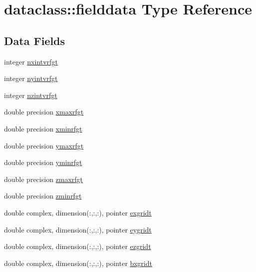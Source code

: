 \hypertarget{structdataclass_1_1fielddata}{}\section{dataclass\+::fielddata Type Reference}
\label{structdataclass_1_1fielddata}
\subsection*{Data Fields}
\begin{DoxyCompactItemize}
\item 
integer \mbox{\hyperlink{structdataclass_1_1fielddata_a9746624865dee3cb084893c584d68b39}{nxintvrfgt}}
\item 
integer \mbox{\hyperlink{structdataclass_1_1fielddata_a57cb8c3f96c761c3253882bf8ea9aca3}{nyintvrfgt}}
\item 
integer \mbox{\hyperlink{structdataclass_1_1fielddata_afce0f79fa31eb44ce2deb1e1ff0efca9}{nzintvrfgt}}
\item 
double precision \mbox{\hyperlink{structdataclass_1_1fielddata_ac91ac792a03611b9d7ea7e9491a9f932}{xmaxrfgt}}
\item 
double precision \mbox{\hyperlink{structdataclass_1_1fielddata_a48a580850e3d44d65f42d8c6a5c7892c}{xminrfgt}}
\item 
double precision \mbox{\hyperlink{structdataclass_1_1fielddata_a41bea18fe0cd9cb24dcab4f811a53d20}{ymaxrfgt}}
\item 
double precision \mbox{\hyperlink{structdataclass_1_1fielddata_a817fb5a469a1095749da14db38aaff2b}{yminrfgt}}
\item 
double precision \mbox{\hyperlink{structdataclass_1_1fielddata_aa1e1937a10ecb4f84e61ab79dfc8b0e3}{zmaxrfgt}}
\item 
double precision \mbox{\hyperlink{structdataclass_1_1fielddata_a7f273248f53c831222242a3cccedd14e}{zminrfgt}}
\item 
double complex, dimension(\+:,\+:,\+:), pointer \mbox{\hyperlink{structdataclass_1_1fielddata_ab07faecce00908ad73041a02d4906c31}{exgridt}}
\item 
double complex, dimension(\+:,\+:,\+:), pointer \mbox{\hyperlink{structdataclass_1_1fielddata_a639f6d59caf105d71786b5af143f5e00}{eygridt}}
\item 
double complex, dimension(\+:,\+:,\+:), pointer \mbox{\hyperlink{structdataclass_1_1fielddata_a2df20efd300756cc323b7e2cd58ca1b3}{ezgridt}}
\item 
double complex, dimension(\+:,\+:,\+:), pointer \mbox{\hyperlink{structdataclass_1_1fielddata_a721338251ef870b206bd747d77330be2}{bxgridt}}

\end{DoxyCompactItemize}
